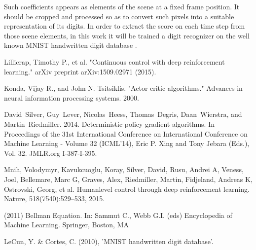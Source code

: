 \documentclass[peerreview]{IEEEtran}
\begin{document}
	  Such coefficients appears as elements of the scene at a fixed frame position. It should be cropped and processed so as to convert such pixels into a suitable representation of its digits. In order to extract the score on each time step from those scene elements, in this work it will be trained a digit recognizer on the well known MNIST handwritten digit database \cite{mnist}.	
	
 
  

\begin{thebibliography}{1}

  Lillicrap, Timothy P., et al. "Continuous control with deep reinforcement learning." arXiv preprint arXiv:1509.02971 (2015).
  
  Konda, Vijay R., and John N. Tsitsiklis. "Actor-critic algorithms." Advances in neural information processing systems. 2000.
  
  David~Silver, Guy~Lever, Nicolas~Heess, Thomas~Degris, Daan~Wierstra, and Martin~Riedmiller. 2014. Deterministic policy gradient algorithms. In Proceedings of the 31st International Conference on International Conference on Machine Learning - Volume 32 (ICML'14), Eric P. Xing and Tony Jebara (Eds.), Vol. 32. JMLR.org I-387-I-395.
  
  
  Mnih, Volodymyr, Kavukcuoglu, Koray, Silver, David, Rusu, Andrei A, Veness, Joel, Bellemare,
Marc G, Graves, Alex, Riedmiller, Martin, Fidjeland, Andreas K, Ostrovski, Georg, et al. Humanlevel control through deep reinforcement learning. Nature, 518(7540):529–533, 2015.


(2011) Bellman Equation. In: Sammut C., Webb G.I. (eds) Encyclopedia of Machine Learning. Springer, Boston, MA


	LeCun, Y. \& Cortes, C. (2010), 'MNIST handwritten digit database'.
 
\end{thebibliography}

\end{document}
